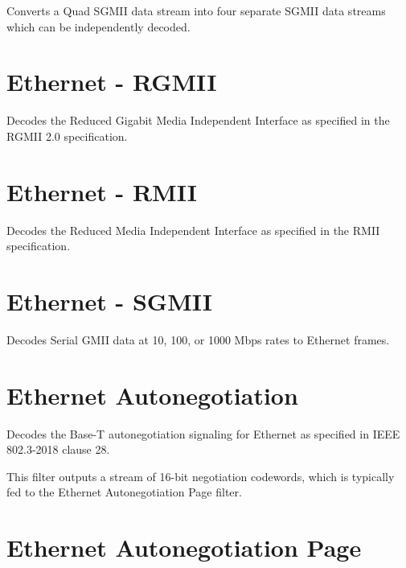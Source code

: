 Converts a Quad SGMII data stream into four separate SGMII data streams which can be independently decoded.

\pagebreak
\section{Ethernet - RGMII}

Decodes the Reduced Gigabit Media Independent Interface as specified in the RGMII 2.0 specification.

\pagebreak
\section{Ethernet - RMII}

Decodes the Reduced Media Independent Interface as specified in the RMII specification.

\pagebreak
\section{Ethernet - SGMII}

Decodes Serial GMII data at 10, 100, or 1000 Mbps rates to Ethernet frames.

\pagebreak
\section{Ethernet Autonegotiation}

Decodes the Base-T autonegotiation signaling for Ethernet as specified in IEEE 802.3-2018 clause 28.

This filter outputs a stream of 16-bit negotiation codewords, which is typically fed to the Ethernet Autonegotiation
Page filter.

\pagebreak
\section{Ethernet Autonegotiation Page}

